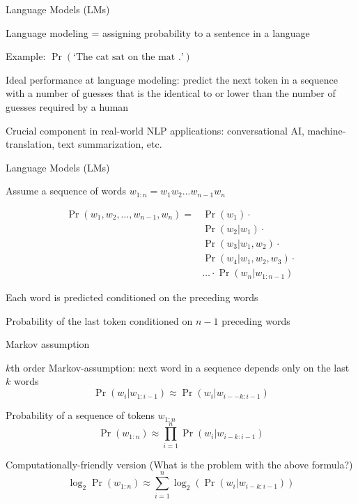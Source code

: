 \documentclass[12pt]{beamer}
\begin{document}
\begin{frame}{Language Models (LMs)}

Language modeling = assigning probability to a sentence in a language

Example: $\Pr(\text{`The cat sat on the mat .'})$

Ideal performance at language modeling: predict the next token in a sequence with a number of guesses that is the identical to or lower than the number of guesses required by a human

Crucial component in real-world NLP applications: conversational AI, machine-translation, text summarization, etc.

\end{frame}
\begin{frame}{Language Models (LMs)}

Assume a sequence of words $w_{1:n} = w_1 w_2 ... w_{n-1} w_n$

$$
\begin{aligned}
\Pr(w_1, w_2, \ldots, w_{n-1}, w_n) = &\Pr(w_1) \cdot \\
& \Pr(w_2|w_1) \cdot \\
& \Pr(w_3|w_1, w_2) \cdot \\
& \Pr(w_4|w_1, w_2, w_3) \cdot \\
& \ldots \cdot \Pr(w_n|w_{1:n-1})
\end{aligned}
$$

Each word is predicted conditioned on the preceding words

Probability of the last token conditioned on $n-1$ preceding words


	
\end{frame}
\begin{frame}{Markov assumption}

$k$th order Markov-assumption: next word in a sequence depends only on the last $k$ words
		\begin{equation*}
		\Pr(w_{i}|w_{1:i-1}) \approx \Pr(w_i | w_{i--k:i-1})
		\end{equation*}

Probability of a sequence of tokens $w_{1:n}$
		\begin{equation*}
		\Pr(w_{1:n}) \approx \prod_{i=1}^{n} \Pr(w_i | w_{i-k:i-1})
		\end{equation*}

Computationally-friendly version (What is the problem with the above formula?)
\pause
\begin{equation*}
\log_2 \Pr(w_{1:n}) \approx \sum_{i=1}^{n} \log_2 \left( \Pr(w_i | w_{i-k:i-1} )\right)
\end{equation*}


\end{frame}
\end{document}
